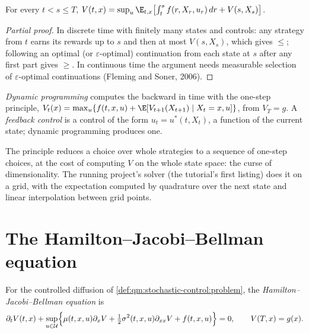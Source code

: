 \begin{theorem}\label{thm:qm:stochastic-control:dpp}
For every $t < s \le T$, $V(t, x) = \sup_u\E_{t,x}\bigl[\int_t^sf(r, X_r, u_r)\,dr + V(s, X_s)\bigr]$.
\end{theorem}

\begin{proof}[Partial proof]
In discrete time with finitely many states and controls: any strategy from $t$ earns its rewards up
to $s$ and then at most $V(s, X_s)$, which gives $\le$; following an optimal (or $\varepsilon$-optimal)
continuation from each state at $s$ after any first part gives $\ge$. In continuous time the argument
needs measurable selection of $\varepsilon$-optimal continuations (Fleming and Soner, 2006).
\end{proof}

\begin{definition}\label{def:qm:stochastic-control:dp}
\emph{Dynamic programming} computes the  backward in time
with the one-step principle, $V_t(x) = \max_u\{f(t, x, u) + \E[V_{t+1}(X_{t+1}) \mid X_t = x, u]\}$, from $V_T =
g$. A \emph{feedback control} is a control of the form $u_t = u^*(t, X_t)$, a function of
the current state; dynamic programming produces one.
\end{definition}

The principle reduces a choice over whole strategies to a sequence of one-step choices, at the cost of
computing $V$ on the whole state space: the curse of dimensionality. The running project's solver
(the tutorial's first listing) does it on a grid, with the expectation computed by
quadrature over the next state and linear interpolation between grid points.

\section{The Hamilton--Jacobi--Bellman equation}

\begin{definition}\label{def:qm:stochastic-control:hjb}
For the controlled diffusion of \cref{def:qm:stochastic-control:problem}, the \emph{Hamilton--Jacobi--Bellman
equation} is
\[
\partial_tV(t, x) + \sup_{u\in\mathcal U}\Bigl\{\mu(t, x, u)\partial_xV + \tfrac12\sigma^2(t, x, u)\partial_{xx}V + f(t, x,
u)\Bigr\} = 0, \qquad V(T, x) = g(x).
\]
\end{definition}

